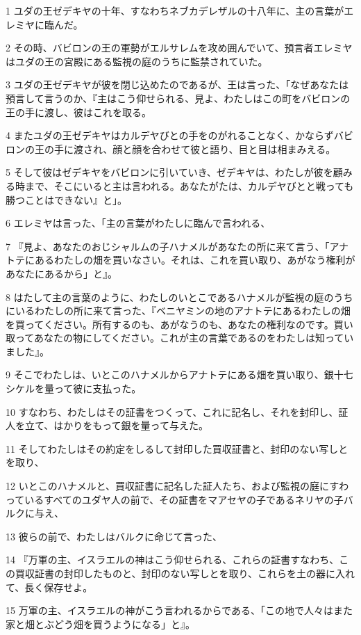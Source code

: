 \par 1 ユダの王ゼデキヤの十年、すなわちネブカデレザルの十八年に、主の言葉がエレミヤに臨んだ。
\par 2 その時、バビロンの王の軍勢がエルサレムを攻め囲んでいて、預言者エレミヤはユダの王の宮殿にある監視の庭のうちに監禁されていた。
\par 3 ユダの王ゼデキヤが彼を閉じ込めたのであるが、王は言った、「なぜあなたは預言して言うのか、『主はこう仰せられる、見よ、わたしはこの町をバビロンの王の手に渡し、彼はこれを取る。
\par 4 またユダの王ゼデキヤはカルデヤびとの手をのがれることなく、かならずバビロンの王の手に渡され、顔と顔を合わせて彼と語り、目と目は相まみえる。
\par 5 そして彼はゼデキヤをバビロンに引いていき、ゼデキヤは、わたしが彼を顧みる時まで、そこにいると主は言われる。あなたがたは、カルデヤびとと戦っても勝つことはできない』と」。
\par 6 エレミヤは言った、「主の言葉がわたしに臨んで言われる、
\par 7 『見よ、あなたのおじシャルムの子ハナメルがあなたの所に来て言う、「アナトテにあるわたしの畑を買いなさい。それは、これを買い取り、あがなう権利があなたにあるから」と』。
\par 8 はたして主の言葉のように、わたしのいとこであるハナメルが監視の庭のうちにいるわたしの所に来て言った、『ベニヤミンの地のアナトテにあるわたしの畑を買ってください。所有するのも、あがなうのも、あなたの権利なのです。買い取ってあなたの物にしてください。これが主の言葉であるのをわたしは知っていました』。
\par 9 そこでわたしは、いとこのハナメルからアナトテにある畑を買い取り、銀十七シケルを量って彼に支払った。
\par 10 すなわち、わたしはその証書をつくって、これに記名し、それを封印し、証人を立て、はかりをもって銀を量って与えた。
\par 11 そしてわたしはその約定をしるして封印した買収証書と、封印のない写しとを取り、
\par 12 いとこのハナメルと、買収証書に記名した証人たち、および監視の庭にすわっているすべてのユダヤ人の前で、その証書をマアセヤの子であるネリヤの子バルクに与え、
\par 13 彼らの前で、わたしはバルクに命じて言った、
\par 14 『万軍の主、イスラエルの神はこう仰せられる、これらの証書すなわち、この買収証書の封印したものと、封印のない写しとを取り、これらを土の器に入れて、長く保存せよ。
\par 15 万軍の主、イスラエルの神がこう言われるからである、「この地で人々はまた家と畑とぶどう畑を買うようになる」と』。
